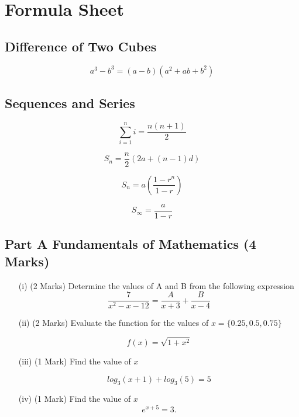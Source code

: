 \documentclass[11pt]{article} %
\begin{document}

\newpage


\LARGE
\section*{Formula Sheet}

\subsection*{Difference of Two Cubes}
\[ a^3 - b^3 = (a-b)(a^2 + ab + b^2)\]
\subsection*{Sequences and Series}
\[ \sum_{i=1}^{n} i = \frac{n(n+1)}{2}\]

\[ S_n = \frac{n}{2} \left(2a + (n-1) d \right)\]

\[ S_n = a\left(\frac{1-r^n}{1-r}\right)\]

\[ S_\infty = \frac{a}{1-r}\]
\newpage


\subsection*{Part A Fundamentals of Mathematics (4 Marks) } %

\begin{itemize}
	
	\item[(i)] (2 Marks) Determine the values of A and B from the following expression
	\[  \frac{7}{x^2-x-12} = \frac{A}{x+3} + \frac{B}{x-4}\]
	\vspace{1.5cm}
	
	\item[(ii)] (2 Marks) Evaluate the function for the values of  $ x = \{0.25, 0.5 , 0.75 \}$
	
	\[  f(x) = \sqrt{1+x^2} \]
	

	\vspace{1.8cm}
	\newpage
	
	\item [(iii)](1 Mark) Find the value of $x$
	
	\[log_3(x + 1) + log_3(5) = 5\]
	
		
		\vspace{1.8cm}
		
	\item[(iv)] (1 Mark) Find the value of $x$
		\[e^{x+5} = 3. \]
	
\end{itemize}
\end{document}
